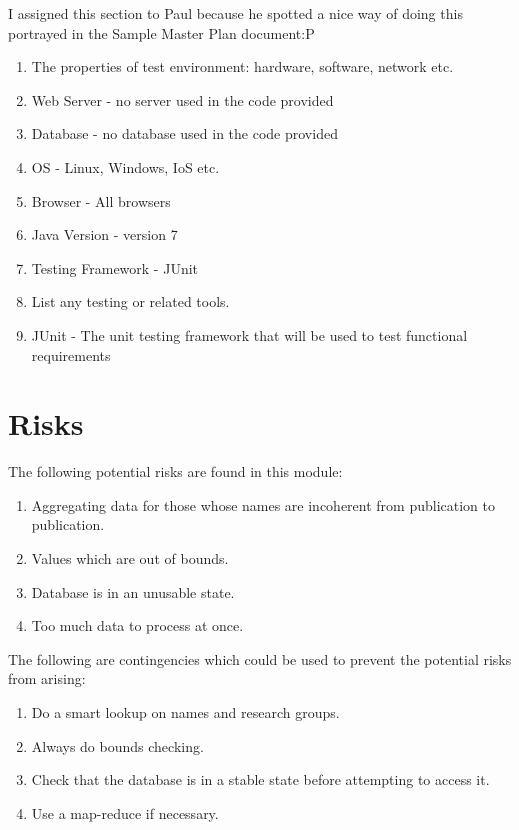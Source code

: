 \begin{enumerate}
I assigned this section to Paul because he spotted a nice way of doing this portrayed in the Sample Master Plan document:P

\begin{enumerate}
	\item The properties of test environment: hardware, software, network etc.
	\item Web Server - no server used in the code provided
	\item Database - no database used in the code provided
	\item OS - Linux, Windows, IoS etc.
	\item Browser - All browsers
	\item Java Version - version 7
	\item Testing Framework - JUnit
	\item List any testing or related tools.
	\item JUnit - The unit testing framework that will be used to test functional requirements
\end{enumerate}

\section{Risks}
	The following potential risks are found in this module:
\begin{enumerate}
	\item Aggregating data for those whose names are incoherent from publication to publication.
	\item Values  which are out of bounds.
	\item Database is in an unusable state.
	\item Too much data to process at once.
\end{enumerate}

	The following are contingencies which could be used to prevent the potential risks from arising:
\begin{enumerate}

	\item Do a smart lookup on names and research groups.
	\item Always do bounds checking.
	\item Check that the database is in a stable state before attempting to access it.
	\item Use a map-reduce if necessary.
         

\end{enumerate}



\end{enumerate}
